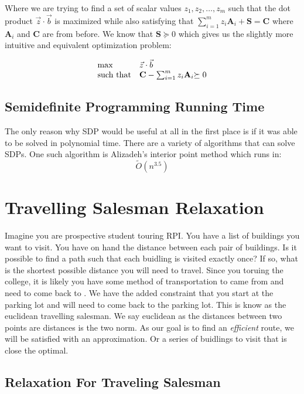 \documentclass{article}
\begin{document}
Where we are trying to find a set of scalar values \( z_1, z_2, \ldots, z_m \) such that the dot product \( \vec{z} \cdot \vec{b} \) is maximized while also satisfying that \( \sum_{i=1}^m z_i \mathbf{A}_{i} + \mathbf{S} = \mathbf{C} \) where \( \mathbf{A}_i \) and \( \mathbf{C} \) are from before.
We know that \( \mathbf{S} \succeq 0 \) which gives us the slightly more intuitive and equivalent optimization problem:

\begin{align*}
  \begin{array}{ll@{}ll}
    \max              & \vec{z} \cdot \vec{b}                              & \\
    \text{such that}  & \mathbf{C} - \sum_{i=1}^m z_i \mathbf{A}_{i}  &\succeq 0 \\
  \end{array}
\end{align*}

\subsection{Semidefinite Programming Running Time}
The only reason why SDP would be useful at all in the first place is if it was able to be solved in polynomial time.
There are a variety of algorithms that can solve SDPs. 
One such algorithm is Alizadeh's interior point method \cite{Arora} which runs in:
\[ \tilde{O}(n^{3.5}) \]

\section{Travelling Salesman Relaxation}   %
Imagine you are prospective student touring RPI. You have a list of buildings you want to visit.
You have on hand the distance between each pair of buildings. 
Is it possible to find a path such that each buidling is visited exactly once? 
If so, what is the shortest possible distance you will need to travel. 
Since you toruing the college, it is likely you have some method of transportation to came from and need to come back to . 
We have the added constraint that you start at the parking lot and will need to come back to the parking lot.
This is know as the euclidean travelling salesman. We say euclidean as the distances between two points are distances is the 
two norm. 
As our goal is to find an \emph{efficient} route, we will be satisfied with an approximation. 
Or a series of buidlings to visit that is close the optimal.
\subsection{Relaxation For Traveling Salesman}
\end{document}
